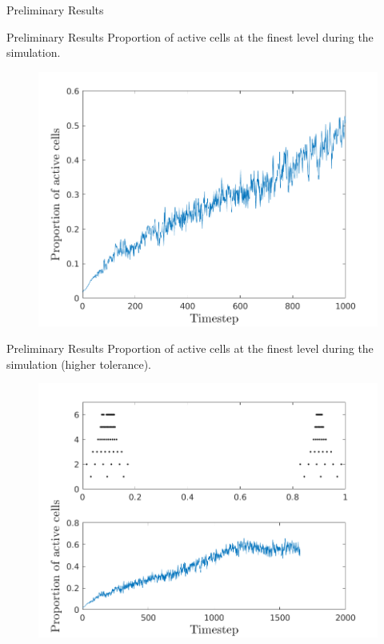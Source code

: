 \documentclass{beamer}
\begin{document}
\begin{frame}{Preliminary Results}
  \begin{figure}
    \center
  \end{figure}
\end{frame}

\begin{frame}{Preliminary Results}
  Proportion of active cells at the finest level during the simulation.
  \begin{figure}
    \center
    \includegraphics[scale=0.5]{numactive_lores.png}
  \end{figure}
\end{frame}

\begin{frame}{Preliminary Results}
  Proportion of active cells at the finest level during the simulation (higher tolerance).
  \begin{figure}
    \center
    \includegraphics[scale=0.5]{numactive_hires.png}
  \end{figure}
\end{frame}
\end{document}
